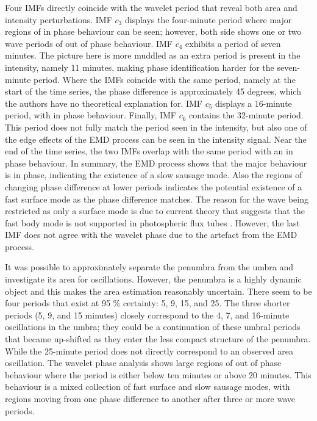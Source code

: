 	Four IMFs directly coincide with the wavelet period that reveal both area and intensity perturbations.
	IMF $c_{3}$ displays the four-minute period where major regions of in phase behaviour can be seen; however, both side shows one or two wave periods of out of phase behaviour.
	IMF $c_{4}$ exhibits a period of seven minutes.
	The picture here is more muddled as an extra period is present in the intensity, namely 11 minutes, making phase identification harder for the seven-minute period.
	Where the IMFs coincide with the same period, namely at the start of the time series, the phase difference is approximately 45 degrees, which the authors have no theoretical explanation for.
	IMF $c_{5}$ displays a 16-minute period, with in phase behaviour.
	Finally, IMF $c_{6}$ contains the 32-minute period.
	This period does not fully match the period seen in the intensity, but also one of the edge effects of the EMD process can be seen in the intensity signal.
	Near the end of the time series, the two IMFs overlap with the same period with an in phase behaviour.
	In summary, the EMD process shows that the major behaviour is in phase, indicating the existence of a slow sausage mode.
	Also the regions of changing phase difference at lower periods indicates the potential existence of a fast surface mode as the phase difference matches.
	The reason for the wave being restricted as only a surface mode is due to current theory that suggests that the fast body mode is not supported in photospheric flux tubes \citep{Moreels2013,Moreels2013b}. 
	However, the last IMF does not agree with the wavelet phase due to the artefact from the EMD process.
	
	It was possible to approximately separate the penumbra from the umbra and investigate its area for oscillations.
	However, the penumbra is a highly dynamic object and this makes the area estimation reasonably uncertain.
	There seem to be four periods that exist at 95 \% certainty: 5, 9, 15, and 25.
	The three shorter periods (5, 9, and 15 minutes) closely correspond to the 4, 7, and 16-minute oscillations in the umbra; they could be a continuation of these umbral periods that became up-shifted as they enter the less compact structure of the penumbra.
	While the 25-minute period does not directly correspond to an observed area oscillation.
	The wavelet phase analysis shows large regions of out of phase behaviour where the period is either below ten minutes or above 20 minutes.
	This behaviour is a mixed collection of fast surface and slow sausage modes, with regions moving from one phase difference to another after three or more wave periods.

